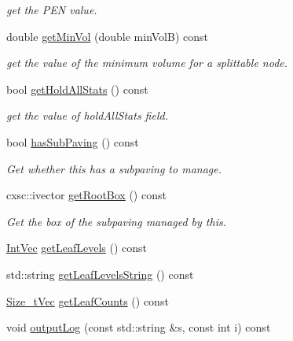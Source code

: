 \begin{DoxyCompactItemize}
\begin{DoxyCompactList}\small\item\em get the \-P\-E\-N value. \end{DoxyCompactList}\item 
double \hyperlink{classsubpavings_1_1AdaptiveHistogram_a0ef2d251d61753086a358bdd9bda057f}{get\-Min\-Vol} (double min\-Vol\-B) const 
\begin{DoxyCompactList}\small\item\em get the value of the minimum volume for a splittable node. \end{DoxyCompactList}\item 
bool \hyperlink{classsubpavings_1_1AdaptiveHistogram_ae90ad88f52691280d18f4b6f2e3b7ad1}{get\-Hold\-All\-Stats} () const 
\begin{DoxyCompactList}\small\item\em get the value of hold\-All\-Stats field. \end{DoxyCompactList}\item 
bool \hyperlink{classsubpavings_1_1AdaptiveHistogram_aaf5eac63bd232e3e76f20a27587c8784}{has\-Sub\-Paving} () const 
\begin{DoxyCompactList}\small\item\em \-Get whether this has a subpaving to manage. \end{DoxyCompactList}\item 
cxsc\-::ivector \hyperlink{classsubpavings_1_1AdaptiveHistogram_a936a3426494278163afada104df26ecc}{get\-Root\-Box} () const 
\begin{DoxyCompactList}\small\item\em \-Get the box of the subpaving managed by this. \end{DoxyCompactList}\item 
\hyperlink{namespacesubpavings_aed8e75b2af342b9c1460431c223dca8e}{\-Int\-Vec} \hyperlink{classsubpavings_1_1AdaptiveHistogram_a70f9af80f0ee875d6dcbfd4cafb53813}{get\-Leaf\-Levels} () const 
\item 
std\-::string \hyperlink{classsubpavings_1_1AdaptiveHistogram_aca69edc461799f9d867d7eea6cb76f8e}{get\-Leaf\-Levels\-String} () const 
\item 
\hyperlink{namespacesubpavings_a612fc5639b45583b9fd33bd304354f81}{\-Size\-\_\-t\-Vec} \hyperlink{classsubpavings_1_1AdaptiveHistogram_aaffb116a24a6de03482a8bfd9625b07f}{get\-Leaf\-Counts} () const 
\item 
void \hyperlink{classsubpavings_1_1AdaptiveHistogram_a8e1ee4de108b97c04c38ccb16c392e5f}{output\-Log} (const std\-::string \&s, const int i) const 

\end{DoxyCompactItemize}
